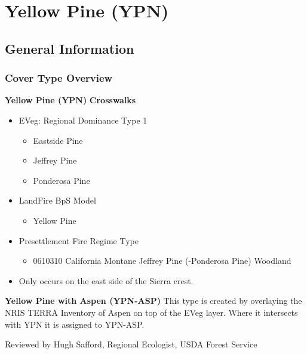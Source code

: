 \newpage
\section{Yellow Pine (YPN)}
\label{ypn-description}

\subsection*{General Information}

\subsubsection*{Cover Type Overview}

\textbf{Yellow Pine (YPN)}
\newline
\textbf{Crosswalks}
\begin{itemize}
	\item EVeg: Regional Dominance Type 1
	\begin{itemize}
		\item Eastside Pine
		\item Jeffrey Pine
		\item Ponderosa Pine
	\end{itemize}

	\item LandFire BpS Model
	\begin{itemize}
		\item Yellow Pine
	\end{itemize}

	\item Presettlement Fire Regime Type
	\begin{itemize}
		\item 0610310 California Montane Jeffrey Pine (-Ponderosa Pine) Woodland
	\end{itemize}

	\item Only occurs on the east side of the Sierra crest.
\end{itemize}

\noindent \textbf{Yellow Pine with Aspen (YPN-ASP)}
\newline
This type is created by overlaying the NRIS TERRA Inventory of Aspen on top of the EVeg layer. Where it intersects with YPN it is assigned to YPN-ASP.

\noindent Reviewed by Hugh Safford, Regional Ecologist, USDA Forest Service

